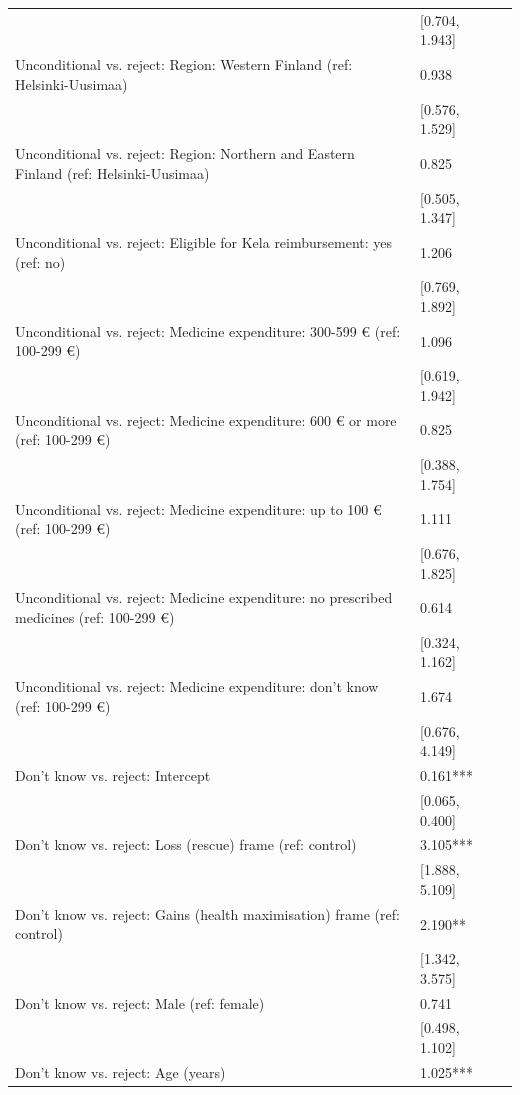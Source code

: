 \begin{tabular}{lll}
& [\num{0.704}, \num{1.943}] &  \\
Unconditional vs. reject: Region: Western Finland (ref: Helsinki-Uusimaa) & \num{0.938} &  \\
& [\num{0.576}, \num{1.529}] &  \\
Unconditional vs. reject: Region: Northern and Eastern Finland (ref: Helsinki-Uusimaa) & \num{0.825} &  \\
& [\num{0.505}, \num{1.347}] &  \\
Unconditional vs. reject: Eligible for Kela reimbursement: yes (ref: no) & \num{1.206} &  \\
& [\num{0.769}, \num{1.892}] &  \\
Unconditional vs. reject: Medicine expenditure: 300-599 € (ref: 100-299 €) & \num{1.096} &  \\
& [\num{0.619}, \num{1.942}] &  \\
Unconditional vs. reject: Medicine expenditure: 600 € or more (ref: 100-299 €) & \num{0.825} &  \\
& [\num{0.388}, \num{1.754}] &  \\
Unconditional vs. reject: Medicine expenditure: up to 100 € (ref: 100-299 €) & \num{1.111} &  \\
& [\num{0.676}, \num{1.825}] &  \\
Unconditional vs. reject: Medicine expenditure: no prescribed medicines (ref: 100-299 €) & \num{0.614} &  \\
& [\num{0.324}, \num{1.162}] &  \\
Unconditional vs. reject: Medicine expenditure: don't know (ref: 100-299 €) & \num{1.674} &  \\
& [\num{0.676}, \num{4.149}] &  \\
Don't know vs. reject: Intercept & \num{0.161}*** &  \\
& [\num{0.065}, \num{0.400}] &  \\
Don't know vs. reject: Loss (rescue) frame (ref: control) & \num{3.105}*** &  \\
& [\num{1.888}, \num{5.109}] &  \\
Don't know vs. reject: Gains (health maximisation) frame (ref: control) & \num{2.190}** &  \\
& [\num{1.342}, \num{3.575}] &  \\
Don't know vs. reject: Male (ref: female) & \num{0.741} &  \\
& [\num{0.498}, \num{1.102}] &  \\
Don't know vs. reject: Age (years) & \num{1.025}*** &  \\

\end{tabular}
